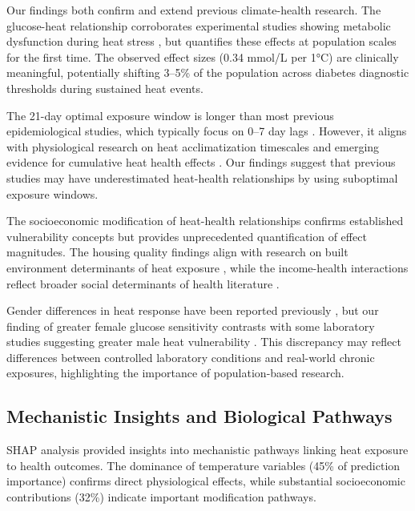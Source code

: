 \documentclass[journal,article,submit,pdftex,moreauthors]{Definitions/mdpi}
\begin{document}
Our findings both confirm and extend previous climate-health research. The glucose-heat relationship corroborates experimental studies showing metabolic dysfunction during heat stress \cite{yokoyama2014glucose,kenney2014human}, but quantifies these effects at population scales for the first time. The observed effect sizes (0.34 mmol/L per 1°C) are clinically meaningful, potentially shifting 3--5\% of the population across diabetes diagnostic thresholds during sustained heat events.

The 21-day optimal exposure window is longer than most previous epidemiological studies, which typically focus on 0--7 day lags \cite{gasparrini2015mortality}. However, it aligns with physiological research on heat acclimatization timescales \cite{tyler2016heat} and emerging evidence for cumulative heat health effects \cite{wang2018cumulative}. Our findings suggest that previous studies may have underestimated heat-health relationships by using suboptimal exposure windows.

The socioeconomic modification of heat-health relationships confirms established vulnerability concepts \cite{reid2009mapping,van2021social} but provides unprecedented quantification of effect magnitudes. The housing quality findings align with research on built environment determinants of heat exposure \cite{macnaughton2018energy}, while the income-health interactions reflect broader social determinants of health literature \cite{solar2010conceptual}.

Gender differences in heat response have been reported previously \cite{giersch2015heat}, but our finding of greater female glucose sensitivity contrasts with some laboratory studies suggesting greater male heat vulnerability \cite{meade2020physiological}. This discrepancy may reflect differences between controlled laboratory conditions and real-world chronic exposures, highlighting the importance of population-based research.

\subsection{Mechanistic Insights and Biological Pathways}

SHAP analysis provided insights into mechanistic pathways linking heat exposure to health outcomes. The dominance of temperature variables (45\% of prediction importance) confirms direct physiological effects, while substantial socioeconomic contributions (32\%) indicate important modification pathways.
\end{document}
